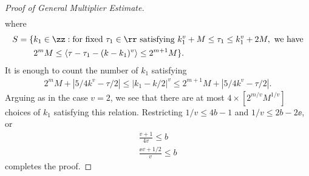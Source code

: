 \begin{proof}[Proof of General Multiplier Estimate]
\begin{equation*}
\begin{split}
\end{split}
\end{equation*}
where
\begin{equation*}
\begin{split}
  S =  \{ & k_{1} \in \zz: \text{for fixed} \ \tau_{1} \in \rr \ \text{satisfying} \ 
  k_{1}^{v} + M \le \tau_{1} \le k_{1}^{v} + 2M, \ \text{we have}
  \\
  & 2^{m} M \le \langle \tau - \tau_{1} - (k - k_{1})^{v} \rangle  \le 2^{m+1}M \}.
\end{split}
\end{equation*}
%
It is enough to count the number of $k_{1}$ satisfying
%
%
\begin{equation*}
\begin{split}
  2^{m}M + | 5/4 k^{v} - \tau/2 | \le | k_{1} - k/2 |^{v} \le 2^{m+1}M + | 5/4 k^{v} - \tau/2 |.
\end{split}
\end{equation*}
%
%
Arguing as in the case $v=2$, we see that there are at most $4 \times [2^{m/v} M^{1/v}]$ choices of $k_{1}$ satisfying this relation. Restricting $1/v \le 4b-1$ and $1/v \le 2b - 2 \ee$,
or
%
%
\begin{gather*}
\frac{v+1}{4v} \le b
\\
\frac{\ee v + 1/2}{v} \le b
\end{gather*}
%
%
completes the proof.
%
%
\end{proof}
%
%
%
